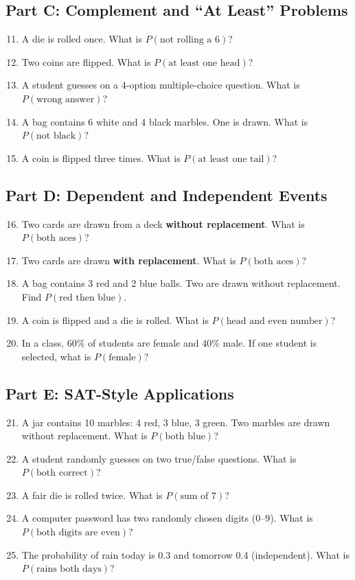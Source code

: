 \documentclass[14pt]{extarticle}
\begin{document}
\subsection*{Part C: Complement and “At Least” Problems}
\begin{enumerate}
  \setcounter{enumi}{10}
  \item A die is rolled once. What is \(P(\text{not rolling a 6})\)?
  \item Two coins are flipped. What is \(P(\text{at least one head})\)?
  \item A student guesses on a 4-option multiple-choice question. What is \(P(\text{wrong answer})\)?
  \item A bag contains 6 white and 4 black marbles. One is drawn. What is \(P(\text{not black})\)?
  \item A coin is flipped three times. What is \(P(\text{at least one tail})\)?
\end{enumerate}

\subsection*{Part D: Dependent and Independent Events}
\begin{enumerate}
  \setcounter{enumi}{15}
  \item Two cards are drawn from a deck \textbf{without replacement}. What is \(P(\text{both aces})\)?
  \item Two cards are drawn \textbf{with replacement}. What is \(P(\text{both aces})\)?
  \item A bag contains 3 red and 2 blue balls. Two are drawn without replacement. Find \(P(\text{red then blue})\).
  \item A coin is flipped and a die is rolled. What is \(P(\text{head and even number})\)?
  \item In a class, 60\% of students are female and 40\% male. If one student is selected, what is \(P(\text{female})\)?
\end{enumerate}

\subsection*{Part E: SAT-Style Applications}
\begin{enumerate}
  \setcounter{enumi}{20}
  \item A jar contains 10 marbles: 4 red, 3 blue, 3 green. Two marbles are drawn without replacement. What is \(P(\text{both blue})\)?
  \item A student randomly guesses on two true/false questions. What is \(P(\text{both correct})\)?
  \item A fair die is rolled twice. What is \(P(\text{sum of 7})\)?
  \item A computer password has two randomly chosen digits (0–9). What is \(P(\text{both digits are even})\)?
  \item The probability of rain today is 0.3 and tomorrow 0.4 (independent). What is \(P(\text{rains both days})\)?
\end{enumerate}
\end{document}
